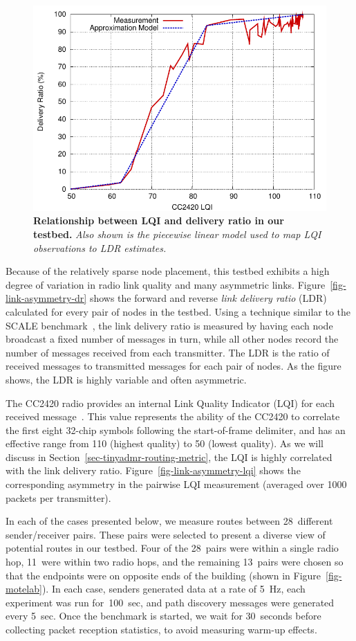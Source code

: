\begin{figure}[t]
\begin{center}
\includegraphics[width=0.6\hsize]{resources/tinyadmr-techrept05/figures/lessons/lqi/dr_vs_lqi.pdf}
\end{center}
\caption{{\small {\bf Relationship between LQI and delivery ratio in our
testbed.}} {\em Also shown is the piecewise linear model used to 
map LQI observations to LDR estimates.}}
\label{fig-del-vs-lqi}
\end{figure}

Because of the relatively sparse node placement, this testbed exhibits
a high degree of variation in radio link quality and many asymmetric
links. Figure~\ref{fig-link-asymmetry-dr} shows the forward and
reverse {\em link delivery ratio} (LDR) calculated for every pair of
nodes in the testbed. Using a technique similar to the
SCALE benchmark~\cite{scale}, the link delivery ratio is measured by 
having each node broadcast a fixed number of messages in turn, while
all other nodes record the number of messages received from each
transmitter. The LDR is the ratio of received messages to transmitted
messages for each pair of nodes. As the figure shows, the LDR is
highly variable and often asymmetric. 

The CC2420 radio provides an internal Link Quality Indicator (LQI)
for each received message~\cite{cc2420-manual}. This value represents
the ability of the CC2420 to correlate the first eight 32-chip symbols
following the start-of-frame delimiter, 
and has an effective range from 110 (highest quality) 
to 50 (lowest quality). As we will discuss in
Section~\ref{sec-tinyadmr-routing-metric}, the LQI is highly correlated with
the link delivery ratio. Figure~\ref{fig-link-asymmetry-lqi} shows
the corresponding asymmetry in the pairwise LQI measurement (averaged
over 1000 packets per transmitter). 

In each of the cases presented below, we measure routes between
28~different sender/receiver pairs. These pairs were selected to present
a diverse view of potential routes in our testbed. Four of the
28~pairs were within a single radio hop, 11~were within two radio
hops, and the remaining 13~pairs were chosen so that the endpoints
were on opposite ends of the building (shown in
Figure~\ref{fig-motelab}). In each case, senders generated
data at a rate of 5~Hz, each experiment was run for~100~sec, 
and path discovery messages were generated every 5~sec.
Once the benchmark is started, we wait for 30~seconds before
collecting packet reception statistics, to avoid measuring
warm-up effects. 

